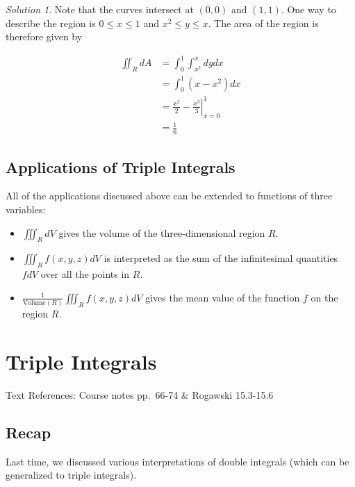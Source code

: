 \documentclass[
]{book}
\providecommand{\tightlist}{%
  \setlength{\itemsep}{0pt}\setlength{\parskip}{0pt}}
\theoremstyle{definition}
\theoremstyle{definition}
\theoremstyle{definition}
\theoremstyle{definition}
\theoremstyle{remark}
\newtheorem*{solution}{Solution}
\begin{document}
\begin{solution}

Note that the curves intersect at \((0,0)\) and \((1,1)\). One way to describe the region is \(0\leq x \leq 1\) and \(x^2\leq y \leq x\). The area of the region is therefore given by

\begin{align*}
\displaystyle \iint_R dA & = \int_0^1 \int_{x^2}^x dy dx \\
&= \int_0^1 (x-x^2) dx\\
&= \left. \frac{x^2}{2}-\frac{x^3}{3}\right |_{x=0}^1\\
& = \frac{1}{6}
\end{align*}

\end{solution}

\hypertarget{applications-of-triple-integrals}{%
\section{Applications of Triple Integrals}\label{applications-of-triple-integrals}}

All of the applications discussed above can be extended to functions of three variables:

\begin{itemize}
\tightlist
\item
  \(\displaystyle \iiint_R dV\) gives the volume of the three-dimensional region \(R\).
\item
  \(\displaystyle \iiint_R f(x,y,z)dV\) is interpreted as the sum of the infinitesimal quantities \(f dV\) over all the points in \(R\).
\item
  \(\displaystyle \frac{1}{\mbox{Volume}(R)} \iiint_R f(x,y,z) dV\) gives the mean value of the function \(f\) on the region \(R\).
\end{itemize}

\hypertarget{lec-15}{%
\chapter{Triple Integrals}\label{lec-15}}

Text References: Course notes pp.~66-74 \& Rogawski 15.3-15.6

\hypertarget{recap-13}{%
\section{Recap}\label{recap-13}}

Last time, we discussed various interpretations of double integrals (which can be generalized to triple integrals).
\end{document}
